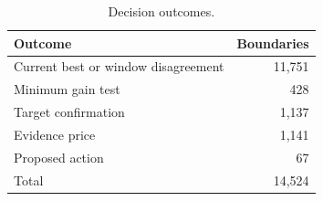 \begin{table}[t]
\centering\small
\caption{Decision outcomes.}
\label{tab:decisions}
\begin{tabular}{@{}lr@{}}\toprule
Outcome & Boundaries \\
\midrule
Current best or window disagreement & 11,751 \\
Minimum gain test & 428 \\
Target confirmation & 1,137 \\
Evidence price & 1,141 \\
Proposed action & 67 \\
\midrule Total & 14,524 \\
\bottomrule\end{tabular}
\end{table}
